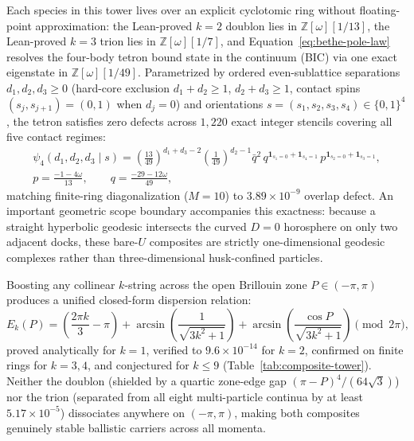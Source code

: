 Each species in this tower lives over an explicit cyclotomic ring without floating-point approximation: the Lean-proved
$k = 2$ doublon lies in $\mathbb{Z}[\omega][1/13]$, the Lean-proved $k = 3$ trion lies in $\mathbb{Z}[\omega][1/7]$, and
Equation~\eqref{eq:bethe-pole-law} resolves the four-body tetron bound state in the continuum (BIC) via one exact
eigenstate in $\mathbb{Z}[\omega][1/49]$. Parametrized by ordered even-sublattice separations $d_1, d_2, d_3 \ge 0$
(hard-core exclusion $d_1 + d_2 \ge 1$, $d_2 + d_3 \ge 1$, contact spins $(s_j, s_{j+1}) = (0, 1)$ when $d_j = 0$) and
orientations $s = (s_1, s_2, s_3, s_4) \in \{0, 1\}^4$, the tetron satisfies zero defects across $1{,}220$ exact integer
stencils covering all five contact regimes:
\begin{gather}
\psi_4(d_1, d_2, d_3 \mid s) = \left(\frac{13}{49}\right)^{d_1+d_3-2}\left(\frac{1}{49}\right)^{d_2-1} \bar{q}^2\,
q^{\mathbf{1}_{s_1=0} + \mathbf{1}_{s_4=1}}\, p^{\mathbf{1}_{s_2=0} + \mathbf{1}_{s_3=1}}, \nonumber\\
p = \frac{-1 - 4\omega}{13},
\qquad
q = \frac{-29 - 12\omega}{49},
\label{eq:tetron-exact}
\end{gather}
matching finite-ring diagonalization ($M = 10$) to $3.89 \times 10^{-9}$ overlap defect. An important geometric scope
boundary accompanies this exactness: because a straight hyperbolic geodesic intersects the curved $D = 0$ horosphere on
only two adjacent docks, these bare-$U$ composites are strictly one-dimensional geodesic complexes rather than
three-dimensional husk-confined particles.

Boosting any collinear $k$-string across the open Brillouin zone $P \in (-\pi, \pi)$ produces a unified closed-form
dispersion relation:
\begin{equation}
E_k(P) = \left(\frac{2\pi k}{3} - \pi\right)
+ \arcsin\!\left(\frac{1}{\sqrt{3k^2+1}}\right)
+ \arcsin\!\left(\frac{\cos P}{\sqrt{3k^2+1}}\right) \pmod{2\pi},
\label{eq:universal-dispersion}
\end{equation}
proved analytically for $k = 1$, verified to $9.6 \times 10^{-14}$ for $k = 2$, confirmed on finite rings for $k = 3, 4$,
and conjectured for $k \le 9$ (Table~\ref{tab:composite-tower}). Neither the doublon (shielded by a quartic zone-edge gap
$(\pi - P)^4 / (64\sqrt{3})$) nor the trion (separated from all eight multi-particle continua by at least
$5.17 \times 10^{-5}$) dissociates anywhere on $(-\pi, \pi)$, making both composites genuinely stable ballistic carriers
across all momenta.


